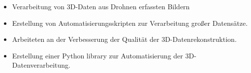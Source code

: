 \dottedline
{}
\begin{itemize}
    \item Verarbeitung von 3D-Daten aus Drohnen erfassten Bildern
    \item Erstellung von Automatisierungsskripten zur Verarbeitung großer Datensätze.
    \item Arbeiteten an der Verbesserung der Qualität der 3D-Datenrekonstruktion.
    \item Erstellung einer Python library zur Automatisierung der 3D-Datenverarbeitung.
\end{itemize}
